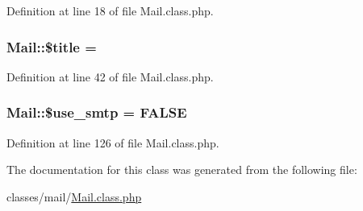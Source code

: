 Definition at line 18 of file Mail.\+class.\+php.

\subsubsection[{\texorpdfstring{\$title}{$title}}]{\setlength{\rightskip}{0pt plus 5cm}Mail\+::\$title = \textquotesingle{}\textquotesingle{}}\hypertarget{classMail_aea1a8697c961d49a688564c5ca16cbcb}{}\label{classMail_aea1a8697c961d49a688564c5ca16cbcb}


Definition at line 42 of file Mail.\+class.\+php.

\subsubsection[{\texorpdfstring{\$use\+\_\+smtp}{$use_smtp}}]{\setlength{\rightskip}{0pt plus 5cm}Mail\+::\$use\+\_\+smtp = F\+A\+L\+SE}\hypertarget{classMail_a8fe39b2063dc112d7db67be074142628}{}\label{classMail_a8fe39b2063dc112d7db67be074142628}


Definition at line 126 of file Mail.\+class.\+php.



The documentation for this class was generated from the following file\+:\begin{DoxyCompactItemize}
\item 
classes/mail/\hyperlink{Mail_8class_8php}{Mail.\+class.\+php}\end{DoxyCompactItemize}
